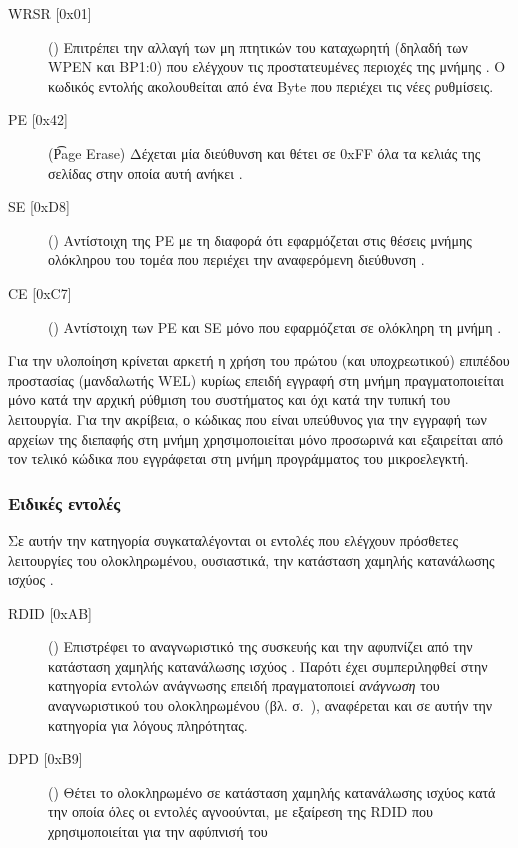 \begin{description}
    \item[WRSR [0x01{]}] () Επιτρέπει την αλλαγή των
    μη πτητικών  του καταχωρητή (δηλαδή των  WPEN και BP1:0) που
    ελέγχουν τις προστατευμένες περιοχές της μνήμης
    \parencite[10--11]{25lc1024}. Ο κωδικός εντολής ακολουθείται από ένα Byte
    που περιέχει τις νέες ρυθμίσεις.

    \item[PE [0x42{]}] (\t{Page Erase}) Δέχεται μία διεύθυνση και θέτει σε 0xFF
    όλα τα κελιάς της σελίδας στην οποία αυτή ανήκει \parencite[13]{25lc1024}.

    \item[SE [0xD8{]}] () Αντίστοιχη της PE με τη διαφορά ότι
    εφαρμόζεται στις θέσεις μνήμης ολόκληρου του τομέα που περιέχει την
    αναφερόμενη διεύθυνση \parencite[14]{25lc1024}.

    \item[CE [0xC7{]}] () Αντίστοιχη των PE και SE μόνο που
    εφαρμόζεται σε ολόκληρη τη μνήμη \parencite[15]{25lc1024}.
\end{description}

Για την υλοποίηση κρίνεται αρκετή η χρήση του πρώτου (και υποχρεωτικού) επιπέδου
προστασίας (μανδαλωτής WEL) κυρίως επειδή εγγραφή στη μνήμη πραγματοποιείται
μόνο κατά την αρχική ρύθμιση του συστήματος και όχι κατά την τυπική του
λειτουργία. Για την ακρίβεια, ο κώδικας που είναι υπεύθυνος για την εγγραφή των
αρχείων της διεπαφής στη μνήμη χρησιμοποιείται μόνο προσωρινά και εξαιρείται από
τον τελικό κώδικα που εγγράφεται στη μνήμη προγράμματος του μικροελεγκτή.


\subsubsection{Ειδικές εντολές}
\label{ssubsec:25lc1024:special-commands}

Σε αυτήν την κατηγορία συγκαταλέγονται οι εντολές που ελέγχουν πρόσθετες
λειτουργίες του ολοκληρωμένου, ουσιαστικά, την κατάσταση χαμηλής κατανάλωσης
ισχύος \parencite[16]{25lc1024}.

\begin{description}
    \item[RDID [0xAB{]}] () Επιστρέφει το αναγνωριστικό της συσκευής
    και την αφυπνίζει από την κατάσταση χαμηλής κατανάλωσης ισχύος
    \parencite[17]{25lc1024}. Παρότι έχει συμπεριληφθεί στην κατηγορία εντολών
    ανάγνωσης επειδή πραγματοποιεί \emph{ανάγνωση} του αναγνωριστικού του
    ολοκληρωμένου (βλ. σ.~\pageref{ssubsec:25lc1024:read-commands:rdid}),
    αναφέρεται και σε αυτήν την κατηγορία για λόγους πληρότητας.

    \item[DPD [0xB9{]}] () Θέτει το ολοκληρωμένο σε
    κατάσταση χαμηλής κατανάλωσης ισχύος κατά την οποία όλες οι εντολές
    αγνοούνται, με εξαίρεση της RDID που χρησιμοποιείται για την αφύπνισή του
    \parencite[16]{25lc1024}
\end{description}



